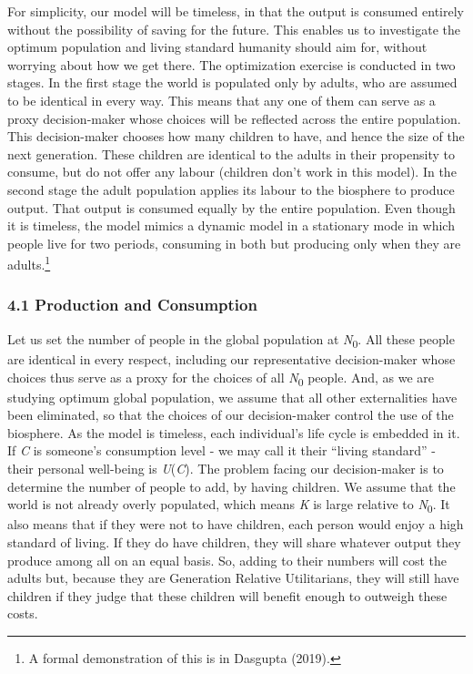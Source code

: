 \documentclass[man,11pt,a4paper,floatsintext]{apa7}
\begin{document}
For simplicity, our model will be timeless, in that the output is consumed entirely without the possibility of saving for the future. This enables us to investigate the optimum population and living standard humanity should aim for, without worrying about how we get there. The optimization exercise is conducted in two stages. In the first stage the world is populated only by adults, who are assumed to be identical in every way. This means that any one of them can serve as a proxy decision-maker whose choices will be reflected across the entire population. This decision-maker chooses how many children to have, and hence the size of the next generation. These children are identical to the adults in their propensity to consume, but do not offer any labour (children don't work in this model). In the second stage the adult population applies its labour to the biosphere to produce output. That output is consumed equally by the entire population. Even though it is timeless, the model mimics a dynamic model in a stationary mode in which people live for two periods, consuming in both but producing only when they are adults.\footnote{A formal demonstration of this is in Dasgupta (2019).}

\subsubsection{4.1 Production and Consumption}

Let us set the number of people in the global population at \textit{N}\textsubscript{0}. All these people are identical in every respect, including our representative decision-maker whose choices thus serve as a proxy for the choices of all \textit{N}\textsubscript{0} people. And, as we are studying optimum global population, we assume that all other externalities have been eliminated, so that the choices of our decision-maker control the use of the biosphere. As the model is timeless, each individual's life cycle is embedded in it. If \textit{C} is someone's consumption level - we may call it their ``living standard'' - their personal well-being is \textit{U}(\textit{C}). The problem facing our decision-maker is to determine the number of people to add, by having children. We assume that the world is not already overly populated, which means \textit{K} is large relative to \textit{N}\textsubscript{0}. It also means that if they were not to have children, each person would enjoy a high standard of living. If they do have children, they will share whatever output they produce among all on an equal basis. So, adding to their numbers will cost the adults but, because they are Generation Relative Utilitarians, they will still have children if they judge that these children will benefit enough to outweigh these costs.
\end{document}
